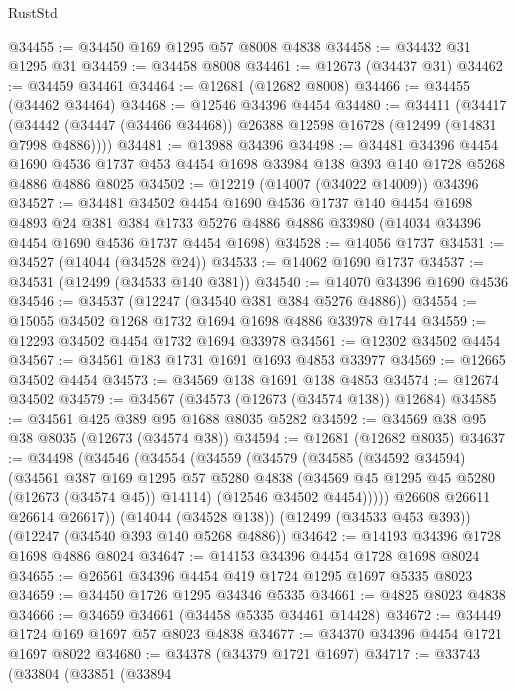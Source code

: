 \begin{lexlean}{RustStd}
\begin{coremodule}
@34455 := @34450 @169 @1295 @57 @8008 @4838
@34458 := @34432 @31 @1295 @31
@34459 := @34458 @8008
@34461 := @12673 (@34437 @31)
@34462 := @34459 @34461
@34464 := @12681 (@12682 @8008)
@34466 := @34455 (@34462 @34464)
@34468 := @12546 @34396 @4454
@34480 := @34411
    (@34417 (@34442 (@34447 (@34466 @34468)) @26388 @12598 @16728 (@12499 (@14831 @7998 @4886))))
@34481 := @13988 @34396
@34498 := @34481
    @34396
    @4454
    @1690
    @4536
    @1737
    @453
    @4454
    @1698
    @33984
    @138
    @393
    @140
    @1728
    @5268
    @4886
    @4886
    @8025
@34502 := @12219 (@14007 (@34022 @14009)) @34396
@34527 := @34481
    @34502
    @4454
    @1690
    @4536
    @1737
    @140
    @4454
    @1698
    @4893
    @24
    @381
    @384
    @1733
    @5276
    @4886
    @4886
    @33980
    (@14034 @34396 @4454 @1690 @4536 @1737 @4454 @1698)
@34528 := @14056 @1737
@34531 := @34527 (@14044 (@34528 @24))
@34533 := @14062 @1690 @1737
@34537 := @34531 (@12499 (@34533 @140 @381))
@34540 := @14070 @34396 @1690 @4536
@34546 := @34537 (@12247 (@34540 @381 @384 @5276 @4886))
@34554 := @15055 @34502 @1268 @1732 @1694 @1698 @4886 @33978 @1744
@34559 := @12293 @34502 @4454 @1732 @1694 @33978
@34561 := @12302 @34502 @4454
@34567 := @34561 @183 @1731 @1691 @1693 @4853 @33977
@34569 := @12665 @34502 @4454
@34573 := @34569 @138 @1691 @138 @4853
@34574 := @12674 @34502
@34579 := @34567 (@34573 (@12673 (@34574 @138)) @12684)
@34585 := @34561 @425 @389 @95 @1688 @8035 @5282
@34592 := @34569 @38 @95 @38 @8035 (@12673 (@34574 @38))
@34594 := @12681 (@12682 @8035)
@34637 := @34498
    (@34546
      (@34554
        (@34559
          (@34579
            (@34585
              (@34592 @34594)
              (@34561
                @387
                @169
                @1295
                @57
                @5280
                @4838
                (@34569 @45 @1295 @45 @5280 (@12673 (@34574 @45)) @14114)
                (@12546 @34502 @4454)))))
        @26608
        @26611
        @26614
        @26617))
    (@14044 (@34528 @138))
    (@12499 (@34533 @453 @393))
    (@12247 (@34540 @393 @140 @5268 @4886))
@34642 := @14193 @34396 @1728 @1698 @4886 @8024
@34647 := @14153 @34396 @4454 @1728 @1698 @8024
@34655 := @26561 @34396 @4454 @419 @1724 @1295 @1697 @5335 @8023
@34659 := @34450 @1726 @1295 @34346 @5335
@34661 := @4825 @8023 @4838
@34666 := @34659 @34661 (@34458 @5335 @34461 @14428)
@34672 := @34449 @1724 @169 @1697 @57 @8023 @4838
@34677 := @34370 @34396 @4454 @1721 @1697 @8022
@34680 := @34378 (@34379 @1721 @1697)
@34717 := @33743
    (@33804
      (@33851
        (@33894

\end{coremodule}
\end{lexlean}
